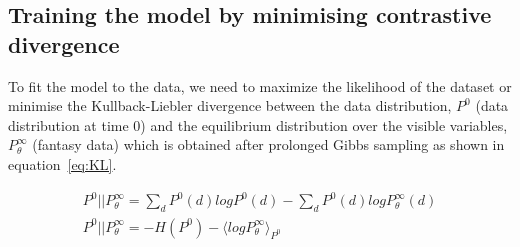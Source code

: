 \documentclass[runningheads,a4paper]{llncs}
\begin{document}
\subsection{Training the model by minimising contrastive divergence}

To fit the model to the data, we need to maximize the likelihood of the dataset or minimise the Kullback-Liebler divergence between the data distribution, $P^0$ (data distribution at time 0) and the equilibrium distribution over the visible variables, $P^\infty_\theta$ (fantasy data) which is obtained after prolonged Gibbs sampling as shown in equation~\ref{eq:KL}. 

\begin{eqnarray}
P^0 || P^\infty_\theta = \sum_{d}P^0 (d)logP^0(d) - \sum_{d}P^0 (d)logP^\infty_\theta(d) \label{eq:KL} \\
P^0 || P^\infty_\theta = -H(P^0) - \langle log P^\infty_\theta \rangle_{P^{0}}
\end{eqnarray}
\end{document}
